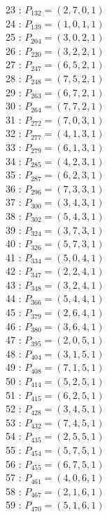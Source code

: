 \documentclass{article}
\begin{document}
{\begin{multicols}{3}
23 : $P_{132}=( 2, 7, 0, 1 )$\\
24 : $P_{139}=( 1, 0, 1, 1 )$\\
25 : $P_{204}=( 3, 0, 2, 1 )$\\
26 : $P_{220}=( 3, 2, 2, 1 )$\\
27 : $P_{247}=( 6, 5, 2, 1 )$\\
28 : $P_{248}=( 7, 5, 2, 1 )$\\
29 : $P_{263}=( 6, 7, 2, 1 )$\\
30 : $P_{264}=( 7, 7, 2, 1 )$\\
31 : $P_{272}=( 7, 0, 3, 1 )$\\
32 : $P_{277}=( 4, 1, 3, 1 )$\\
33 : $P_{279}=( 6, 1, 3, 1 )$\\
34 : $P_{285}=( 4, 2, 3, 1 )$\\
35 : $P_{287}=( 6, 2, 3, 1 )$\\
36 : $P_{296}=( 7, 3, 3, 1 )$\\
37 : $P_{300}=( 3, 4, 3, 1 )$\\
38 : $P_{302}=( 5, 4, 3, 1 )$\\
39 : $P_{324}=( 3, 7, 3, 1 )$\\
40 : $P_{326}=( 5, 7, 3, 1 )$\\
41 : $P_{334}=( 5, 0, 4, 1 )$\\
42 : $P_{347}=( 2, 2, 4, 1 )$\\
43 : $P_{348}=( 3, 2, 4, 1 )$\\
44 : $P_{366}=( 5, 4, 4, 1 )$\\
45 : $P_{379}=( 2, 6, 4, 1 )$\\
46 : $P_{380}=( 3, 6, 4, 1 )$\\
47 : $P_{395}=( 2, 0, 5, 1 )$\\
48 : $P_{404}=( 3, 1, 5, 1 )$\\
49 : $P_{408}=( 7, 1, 5, 1 )$\\
50 : $P_{414}=( 5, 2, 5, 1 )$\\
51 : $P_{415}=( 6, 2, 5, 1 )$\\
52 : $P_{428}=( 3, 4, 5, 1 )$\\
53 : $P_{432}=( 7, 4, 5, 1 )$\\
54 : $P_{435}=( 2, 5, 5, 1 )$\\
55 : $P_{454}=( 5, 7, 5, 1 )$\\
56 : $P_{455}=( 6, 7, 5, 1 )$\\
57 : $P_{461}=( 4, 0, 6, 1 )$\\
58 : $P_{467}=( 2, 1, 6, 1 )$\\
59 : $P_{470}=( 5, 1, 6, 1 )$\\

\end{multicols}}
\end{document}
